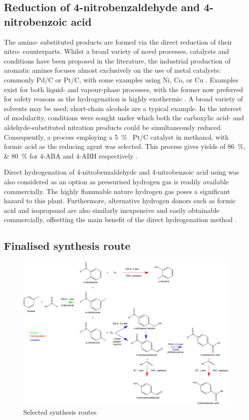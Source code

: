 
\subsection{Reduction of 4-nitrobenzaldehyde and 4-nitrobenzoic acid}

The amino- substituted products are formed via the direct reduction of their nitro- counterparts. Whilst a broad variety of novel processes, catalysts and conditions have been proposed in the literature, the industrial production of aromatic amines focuses almost exclusively on the use of metal catalysts: commonly Pd/C or Pt/C, with some examples using Ni, Co, or Cu \cite{vogt_amines_2000,cartolano_amines_2004}. Examples exist for both liquid- and vapour-phase processes, with the former now preferred for safety reasons as the hydrogenation is highly exothermic \cite{vogt_amines_2000}. A broad variety of solvents may be used; short-chain alcohols are a typical example. In the interest of modularity, conditions were sought under which both the carboxylic acid- and aldehyde-substituted nitration products could be simultaneously reduced. Consequently, a process employing a \SI{5}{\percent\ww} Pt/C catalyst in methanol, with formic acid as the reducing agent was selected. This process gives yields of \SIlist{86;80}{\percent} for 4-ABA and 4-ABH respectively \cite{gowda_catalytic_2000}.

Direct hydrogenation of 4-nitrobenzaldehyde and 4-nitrobenzoic acid using  was also considered as an option as pressurised hydrogen gas is readily available commercially. The highly flammable nature hydrogen gas poses a significant hazard to this plant. Furthermore, alternative hydrogen donors such as formic acid and isopropanol are also similarly inexpensive and easily obtainable commercially, offsetting the main benefit of the direct hydrogenation method \cite{wang_golden_nodate}. 

\subsection{Finalised synthesis route} %
\begin{figure}[h]
    \centering
    \includegraphics[width=\linewidth]{1-Figures/routes-chosen_20210220.png}
    \caption{Selected synthesis routes}
    \label{fig:routes}
\end{figure}
 
